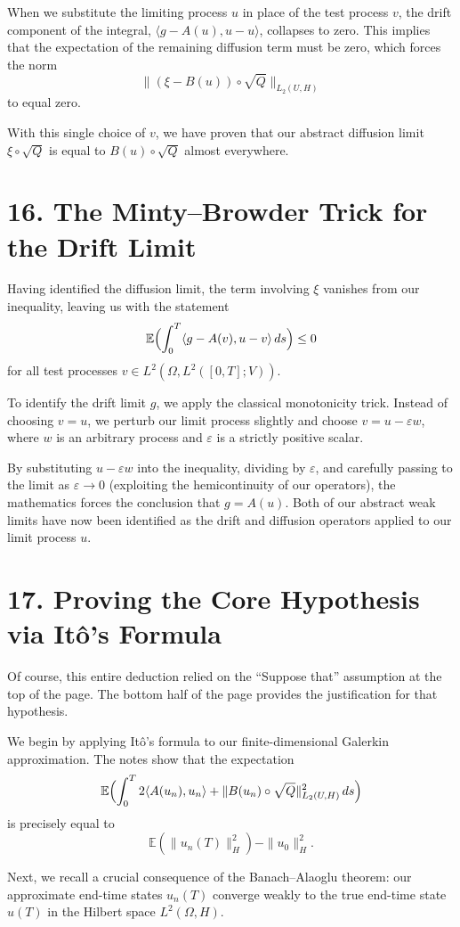 \documentclass[11pt]{article}
\theoremstyle{definition}
\theoremstyle{remark}
\begin{document}
When we substitute the limiting process $u$ in place of the test process $v$, the drift component of the integral, $\langle g-A(u), u-u \rangle$, collapses to zero. This implies that the expectation of the remaining diffusion term must be zero, which forces the norm
\[
  \|(\xi-B(u))\circ \sqrt{Q}\|_{L_2(U,H)}
\]
to equal zero.

With this single choice of $v$, we have proven that our abstract diffusion limit $\xi\circ \sqrt{Q}$ is equal to $B(u)\circ \sqrt{Q}$ almost everywhere.

\section*{16. The Minty--Browder Trick for the Drift Limit}
Having identified the diffusion limit, the term involving $\xi$ vanishes from our inequality, leaving us with the statement
\[
  \mathbb{E}\Bigl(\int_0^T \langle g-A(v), u-v \rangle\,ds\Bigr) \le 0
\]
for all test processes $v\in L^2(\Omega, L^2([0,T];V))$.

To identify the drift limit $g$, we apply the classical monotonicity trick. Instead of choosing $v=u$, we perturb our limit process slightly and choose $v=u-\varepsilon w$, where $w$ is an arbitrary process and $\varepsilon$ is a strictly positive scalar.

By substituting $u-\varepsilon w$ into the inequality, dividing by $\varepsilon$, and carefully passing to the limit as $\varepsilon\to 0$ (exploiting the hemicontinuity of our operators), the mathematics forces the conclusion that $g=A(u)$. Both of our abstract weak limits have now been identified as the drift and diffusion operators applied to our limit process $u$.

\section*{17. Proving the Core Hypothesis via It\^o's Formula}
Of course, this entire deduction relied on the ``Suppose that'' assumption at the top of the page. The bottom half of the page provides the justification for that hypothesis.

We begin by applying It\^o's formula to our finite-dimensional Galerkin approximation. The notes show that the expectation
\[
  \mathbb{E}\Bigl(\int_0^T 2\langle A(u_n), u_n \rangle + \|B(u_n)\circ \sqrt{Q}\|_{L_2(U,H)}^2\,ds\Bigr)
\]
is precisely equal to
\[
  \mathbb{E}(\|u_n(T)\|_H^2) - \|u_0\|_H^2.
\]

Next, we recall a crucial consequence of the Banach--Alaoglu theorem: our approximate end-time states $u_n(T)$ converge weakly to the true end-time state $u(T)$ in the Hilbert space $L^2(\Omega,H)$.
\end{document}
